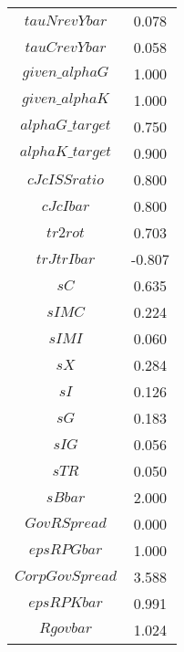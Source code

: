 \begin{center}
\begin{longtable}{cc}
$tauNrevYbar$ 	 & 	 0.078 \\
$tauCrevYbar$ 	 & 	 0.058 \\
$given\_alphaG$ 	 & 	 1.000 \\
$given\_alphaK$ 	 & 	 1.000 \\
$alphaG\_target$ 	 & 	 0.750 \\
$alphaK\_target$ 	 & 	 0.900 \\
$cJcISSratio$ 	 & 	 0.800 \\
$cJcIbar$ 	 & 	 0.800 \\
$tr2rot$ 	 & 	 0.703 \\
$trJtrIbar$ 	 & 	 -0.807 \\
$sC$ 	 & 	 0.635 \\
$sIMC$ 	 & 	 0.224 \\
$sIMI$ 	 & 	 0.060 \\
$sX$ 	 & 	 0.284 \\
$sI$ 	 & 	 0.126 \\
$sG$ 	 & 	 0.183 \\
$sIG$ 	 & 	 0.056 \\
$sTR$ 	 & 	 0.050 \\
$sBbar$ 	 & 	 2.000 \\
$GovRSpread$ 	 & 	 0.000 \\
$epsRPGbar$ 	 & 	 1.000 \\
$CorpGovSpread$ 	 & 	 3.588 \\
$epsRPKbar$ 	 & 	 0.991 \\
$Rgovbar$ 	 & 	 1.024 \\
\bottomrule%
\end{longtable}
\end{center}
